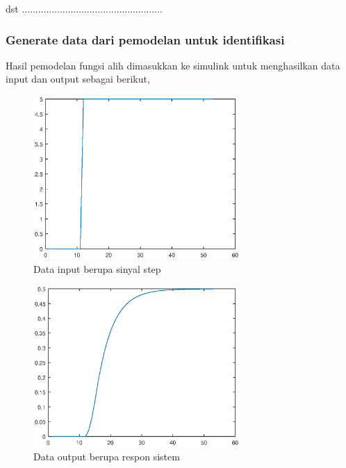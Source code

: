 \documentclass[../main.tex]{subfiles}
\begin{document}
                dst ....................................................
               
            \subsubsection{Generate data dari pemodelan untuk identifikasi}
                Hasil pemodelan fungsi alih dimasukkan ke simulink untuk menghasilkan data input dan output sebagai berikut,
                \begin{figure}[H]
                    \centering
                    \includegraphics[width = 0.7\textwidth]{assets/image/INPUT.eps}
                    \caption{Data input berupa sinyal step}
                    \label{gambar_2}
                \end{figure}
                \begin{figure}[H]
                    \centering
                    \includegraphics[width = 0.7\textwidth]{assets/image/OUTPUT.eps}
                    \caption{Data output berupa respon sistem}
                    \label{gambar_3}
                \end{figure}
                
\end{document}
